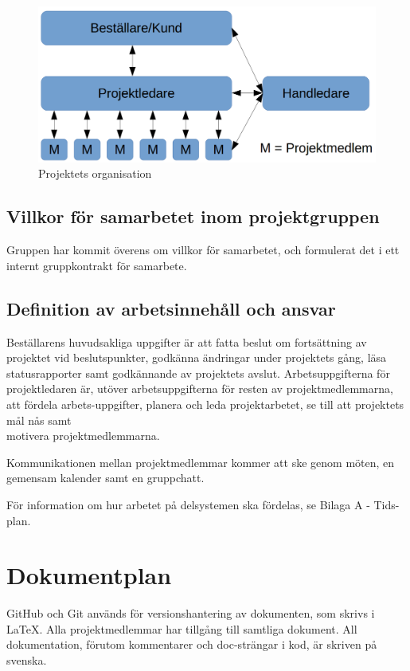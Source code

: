 \documentclass[a4paper,titlepage,12pt]{article}
\begin{document}
	\begin{figure}[h!]
		\begin{center}
		\includegraphics[width=0.8\linewidth]{images/projectroles.png}
		\caption{Projektets organisation \label{fig:organization}}
		\end{center}
	\end{figure}
	 
	\subsection{Villkor för samarbetet inom projektgruppen}
    Gruppen har kommit överens om villkor för samarbetet, och formulerat det i
    ett internt gruppkontrakt för samarbete.
	
	\subsection{Definition av arbetsinnehåll och ansvar}
	Beställarens huvudsakliga uppgifter är att fatta beslut
	om fortsättning av projektet vid beslutspunkter, godkänna
	ändringar under projektets gång, läsa statusrapporter samt godkännande av
	projektets avslut. Arbetsuppgifterna för projektledaren är, utöver
	arbetsuppgifterna för resten av projektmedlemmarna, att fördela
	arbets-uppgifter, planera och leda projektarbetet, se till att projektets mål
	nås samt \\ motivera projektmedlemmarna.

	Kommunikationen mellan projektmedlemmar kommer att ske genom möten, en
	gemensam kalender samt en gruppchatt.
	
	För information om hur arbetet på delsystemen ska fördelas, se Bilaga
	A - Tids-plan.
	
	\section{Dokumentplan}
	GitHub och Git används för versionshantering av
	dokumenten, som skrivs i LaTeX. Alla projektmedlemmar har tillgång till
	samtliga dokument. All dokumentation, förutom kommentarer och doc-strängar
	i kod, är skriven på svenska.
\end{document}
